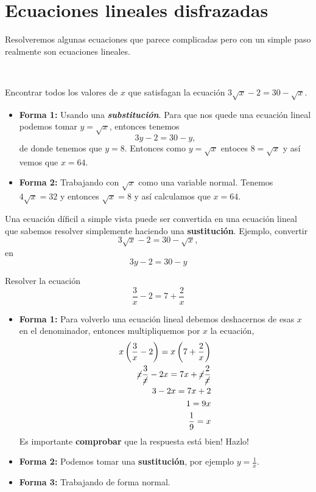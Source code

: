 \section{Ecuaciones lineales disfrazadas}\label{Section_ecuaciones_lineales_disfrazadas}
Resolveremos algunas ecuaciones que parece complicadas pero con un simple paso realmente son ecuaciones lineales.

\begin{ejemplo}{\ \\}
\item Encontrar todos los valores de $x$ que satisfagan la ecuación $3\sqrt{x} - 2 = 30-\sqrt{x}$.\\
		\begin{itemize}
		\item \textbf{Forma 1:} Usando una \textbf{\textit{substitución}}. Para que nos quede una ecuación lineal podemos tomar $y=\sqrt{x}$, entonces tenemos
		\[3y-2 = 30-y,\]
		de donde tenemos que $y=8$. Entonces como $y=\sqrt{x}$ entoces $8=\sqrt{x}$ y así vemos que $x=64$.
		
		\item \textbf{Forma 2:} Trabajando con $\sqrt{x}$ como una variable normal. Tenemos $4\sqrt{x}=32$ y entonces $\sqrt{x}=8$ y así calculamos que $x=64$.
		\end{itemize} 
\end{ejemplo}


\begin{tcolorbox}[colback=red!5!white,colframe=red!75!black]
		Una ecuación díficil a simple vista puede ser convertida en una ecuación lineal que sabemos resolver simplemente haciendo una \textbf{sustitución}. Ejemplo, convertir
		\[3\sqrt{x} - 2 = 30-\sqrt{x},\]
		en
		\[3y-2 = 30-y\]
\end{tcolorbox}

\begin{ejemplo} Resolver la ecuación
\[\frac{3}{x} - 2=7+\frac{2}{x}\]
\begin{itemize}
	\item \textbf{Forma 1:} Para volverlo una ecuación lineal debemos deshacernos de esas $x$ en el denominador, entonces multipliquemos por $x$ la ecuación,
	\begin{align*}
		x \left( \frac{3}{x} - 2 \right) =x \left(7+\frac{2}{x}\right)\\
		\cancel{x} \frac{3}{\cancel{x}} - 2x  =7x+\cancel{x}\frac{2}{\cancel{x}}\\
		3-2x=7x+2\\
		1=9x\\
		\frac{1}{9} = x
	\end{align*}
	Es importante \textbf{comprobar }que la respuesta está bien! Hazlo!
	\item \textbf{Forma 2:} Podemos tomar una \textbf{sustitución}, por ejemplo $y=\frac{1}{x}$.
	\item \textbf{Forma 3:} Trabajando de forma normal.
\end{itemize} 
\end{ejemplo}

